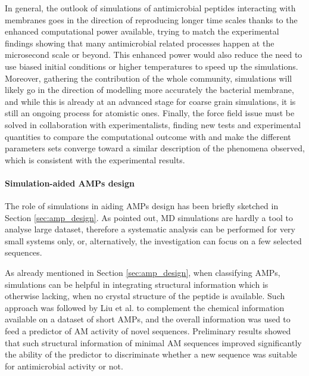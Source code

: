 In general, the outlook of simulations of antimicrobial peptides interacting with membranes goes in the direction of reproducing longer time scales thanks to the enhanced computational power available, trying to match the experimental findings showing that many antimicrobial related processes happen at the microsecond scale or beyond.
%
This enhanced power would also reduce the need to use biased initial conditions or higher temperatures to speed up the simulations.
%
Moreover, gathering the contribution of the whole community, simulations will likely go in the direction of modelling more accurately the bacterial membrane, and while this is already at an advanced stage for coarse grain simulations, it is still an ongoing process for atomistic ones.
%
Finally, the force field issue must be solved in collaboration with experimentalists, finding new tests and experimental quantities to compare the computational outcome with and make the different parameters sets converge toward a similar description of the phenomena observed, which is consistent with the experimental results.


\paragraph{Simulation-aided AMPs design}

The role of simulations in aiding AMPs design has been briefly sketched in Section \ref{sec:amp_design}. As pointed out, MD simulations are hardly a tool to analyse large dataset, therefore a systematic analysis can be performed for very small systems only, or, alternatively, the investigation can focus on a few selected sequences.

As already mentioned in Section \ref{sec:amp_design}, when classifying AMPs, simulations can be helpful in integrating structural information which is otherwise lacking, when no crystal structure of the peptide is available. Such approach was followed by Liu et al. \cite{Liu2018} to complement the chemical information available on a dataset of short AMPs, and the overall information was used to feed a predictor of AM activity of novel sequences. Preliminary results showed that such structural information of minimal AM sequences improved significantly the ability of the predictor to discriminate whether a new sequence was suitable for antimicrobial activity or not.

